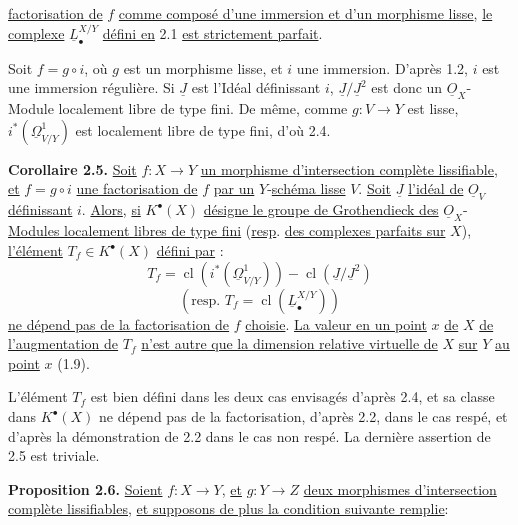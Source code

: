 
\uline{factorisation de} $f$ \uline{comme composé d'une immersion et d'un morphisme lisse}, \uline{le complexe} $\underline{L}^{X/Y}_\bullet$ \uline{défini en} 2.1 \uline{est strictement parfait}.

Soit $f=g\circ i$, où $g$ est un morphisme lisse, et $i$ une immersion. D'après 1.2, $i$ est une immersion régulière. Si $\underline{J}$ est l'Idéal définissant $i$, $\underline{J}/\underline{J}^2$ est donc un $\underline{O}_X$-Module localement libre de type fini. De même, comme $g:V\to Y$ est lisse, $i^*(\underline{\Omega}^1_{V/Y})$ est localement libre de type fini, d'où 2.4.

\textbf{Corollaire 2.5.} \uline{Soit} $f:X\to Y$ \uline{un morphisme d'intersection complète lissifiable}, \uline{et} $f=g\circ i$ \uline{une factorisation de} $f$ \uline{par un} $Y$-\uline{schéma lisse} $V$. \uline{Soit} $\underline{J}$ \uline{l'idéal de} $\underline{O}_V$ \uline{définissant} $i$. \uline{Alors}, \uline{si} $K^{\bullet}(X)$ \uline{désigne le groupe de Grothendieck des} $\underline{O}_X$-\uline{Modules localement libres de type fini} (\uline{resp}. \uline{des complexes parfaits sur} $X$), \uline{l'élément} $T_f\in K^{\bullet}(X)$ \uline{défini par} :
\[
T_f=\operatorname{cl}(i^*(\underline{\Omega}^1_{V/Y}))-\operatorname{cl}(\underline{J}/\underline{J}^2)
\]
\[
(\text{resp. }T_f=\operatorname{cl}(\underline{L}^{X/Y}_\bullet))
\]
\uline{ne dépend pas de la factorisation de} $f$ \uline{choisie}. \uline{La valeur en un point} $x$ \uline{de} $X$ \uline{de l'augmentation de} $T_f$ \uline{n'est autre que la dimension relative virtuelle de} $X$ \uline{sur} $Y$ \uline{au point} $x$ (1.9).

L'élément $T_f$ est bien défini dans les deux cas envisagés d'après 2.4, et sa classe dans $K^{\bullet}(X)$ ne dépend pas de la factorisation, d'après 2.2, dans le cas respé, et d'après la démonstration de 2.2 dans le cas non respé. La dernière assertion de 2.5 est triviale.

\textbf{Proposition 2.6.} \uline{Soient} $f:X\to Y$, \uline{et} $g:Y\to Z$ \uline{deux morphismes d'intersection complète lissifiables}, \uline{et supposons de plus la condition suivante remplie}:


